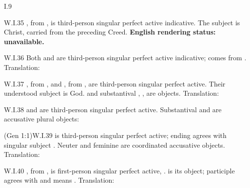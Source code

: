 \begin{courseunit}{I.9}
\begin{workedexample}{}{W.I.35}
, from ,
is third-person singular perfect active indicative. The subject is Christ,
carried from the preceding Creed.
\textbf{English rendering status: unavailable.}
\end{workedexample}

\begin{workedexample}{}{W.I.36}
Both  and  are third-person singular perfect
active indicative;  comes from . Translation: 
\end{workedexample}

\begin{workedexample}{}{W.I.37}
, from , and
, from , are
third-person singular perfect active. Their understood subject is God.
 and substantival , , are
objects. Translation: 
\end{workedexample}

\begin{workedexample}{}{W.I.38}
 and  are third-person singular perfect
active. Substantival  and  are accusative
plural objects: 
\end{workedexample}

\begin{workedexample}{ (Gen 1:1)}{W.I.39}
 is third-person singular perfect active; ending 
agrees with singular subject . Neuter  and feminine
 are coordinated accusative objects. Translation:
\end{workedexample}

\begin{workedexample}{}{W.I.40}
, from , is first-person singular
perfect active, .  is its object; participle
 agrees with  and means . Translation: 
\end{workedexample}


\end{courseunit}
